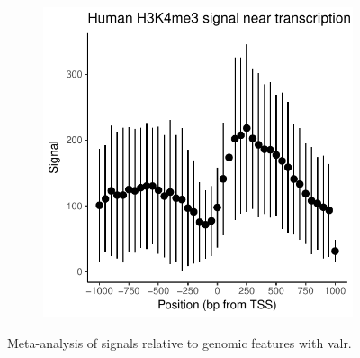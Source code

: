 \documentclass[9pt,a4paper]{extarticle}
\begin{document}
\begin{figure}
\begin{subfigure}[b]{0.5\textwidth}
        \includegraphics[width=\textwidth]{demo-tss-1.pdf}
        \label{fig:meta_gene_out}
    \end{subfigure}
\caption{\label{fig:your-figure}Meta-analysis of signals relative to genomic features with valr.}
\end{figure}








\end{document}
